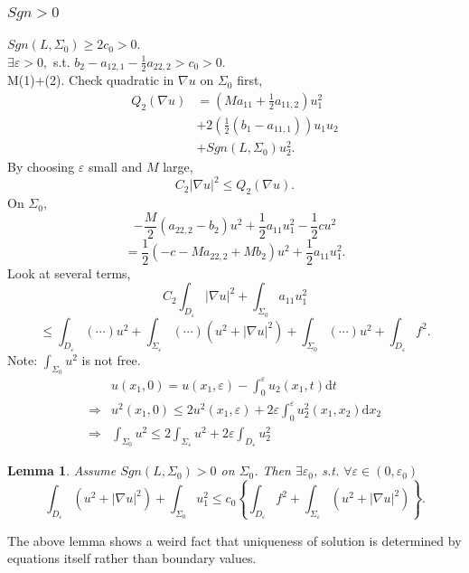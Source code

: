 \documentclass[12pt]{article}
\newtheorem{lemma}{Lemma}
\begin{document}
\subsubsection{$Sgn>0$}
$Sgn(L,\Sigma_0)\ge 2c_0>0$.\\
$\exists \varepsilon>0, $ s.t. $b_2-a_{12,1}-\frac{1}{2}a_{22,2}>c_0>0. $\\
M(1)+(2). Check quadratic in $\nabla u$ on $\Sigma_0$ first,
\begin{align*}
Q_2(\nabla u) &=\left(Ma_{11}+\frac{1}{2}a_{11,2} \right)u_1^2\\
&+2\left(\frac{1}{2}(b_1-a_{11,1}) \right)u_1u_2\\
&+Sgn(L,\Sigma_0)u^2_2.	
\end{align*}
By choosing $\varepsilon$ small and $M$ large,
\[C_2|\nabla u|^2 \le Q_2(\nabla u). \]
On $\Sigma_0$,
\[-\frac{M}{2}(a_{22,2}-b_2)u^2+\frac{1}{2}a_{11}u_1^2-\frac{1}{2}cu^2 \]
\[ =\frac{1}{2}(-c-Ma_{22,2}+Mb_2)u^2+\frac{1}{2}a_{11}u^2_1. \]
Look at several terms,
\[C_2\int_{D_\varepsilon}|\nabla u|^2+\int_{\Sigma_0}a_{11}u^2_1 \]
\[ \le \int_{D_\varepsilon}(\cdots)u^2+\int_{\Sigma_\varepsilon}(\cdots)\left(u^2+|\nabla u|^2\right)+\int_{\Sigma_0}(\cdots)u^2+\int_{D_\varepsilon}f^2. \]
Note: $\int_{\Sigma_0}u^2 $ is not free.
\begin{align*}
&u(x_1, 0)=u(x_1,\varepsilon)-\int_0^\varepsilon u_2(x_1,t)\mathrm{d}t\\
\Rightarrow&u^2(x_1,0)\le 2u^2(x_1,\varepsilon)+2\varepsilon\int_0^\varepsilon u^2_2(x_1,x_2)\mathrm{d}x_2\\
\Rightarrow&\int_{\Sigma_0}u^2\le 2\int_{\Sigma_\varepsilon}u^2+2\varepsilon\int_{D_\varepsilon}u^2_2
\end{align*}
\begin{lemma}
Assume $Sgn(L, \Sigma_0)>0$ on $\Sigma_0$. Then $\exists \varepsilon_0 $, s.t. $\forall\varepsilon\in(0, \varepsilon_0)$
\[\int_{D_\varepsilon}\left(u^2+|\nabla u|^2\right)+\int_{\Sigma_0}u^2_1\le c_0\left\{\int_{D_\varepsilon}f^2+\int_{\Sigma_\varepsilon}\left(u^2+|\nabla u|^2\right) \right\}. \]
\end{lemma}
The above lemma shows a weird fact that uniqueness of solution is determined by equations itself rather than boundary values.
\end{document}
